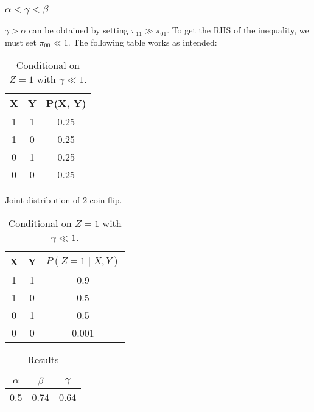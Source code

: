 \documentclass{article}
\numberwithin{equation}{section}
\theoremstyle{named}
\begin{document}
\subsubsection{$\alpha < \gamma < \beta$}
$\gamma > \alpha$ can be obtained by setting $\pi_{11} \gg \pi_{01}$. To get 
the RHS of the inequality, we must set $\pi_{00}\ll 1$.
The following table works as intended:
\begin{table}[H]
\begin{minipage}{.45\textwidth}
        \centering
        
        \begin{tabular}{|c|c|c|}
                \hline
                X & Y & P(X, Y) \\  \hline
                1 & 1 & 0.25 \\\hline 
                1 & 0 & 0.25 \\\hline 
                0 & 1 & 0.25 \\\hline 
                0 & 0 & 0.25 \\\hline
        \end{tabular}
        \caption{Joint distribution of 2 coin flip.}
\end{minipage}
\begin{minipage}{.45\textwidth}
        \centering
        \begin{tabular}{|c|c|c|}
                \hline
                X & Y & $P(Z = 1 \mid X, Y)$ \\\hline
                1 & 1 & 0.9 \\\hline
                1 & 0 & 0.5 \\\hline
                0 & 1 & 0.5 \\\hline
                0 & 0 & 0.001 \\\hline
        \end{tabular}
        \caption{Conditional on $Z = 1$ with $\gamma \ll 1$.}
\end{minipage}
        \label{tab:Joint2}
\end{table}

\begin{table}[H]
        \centering
        \begin{tabular}{|c|c|c|}
                \hline 
                $\alpha$ & $\beta$ & $\gamma$ \\ \hline 
                0.5 & 0.74 & 0.64 \\\hline
        \end{tabular}
        \caption{Results}
        \label{tab:Res2}
\end{table}
\end{document}
